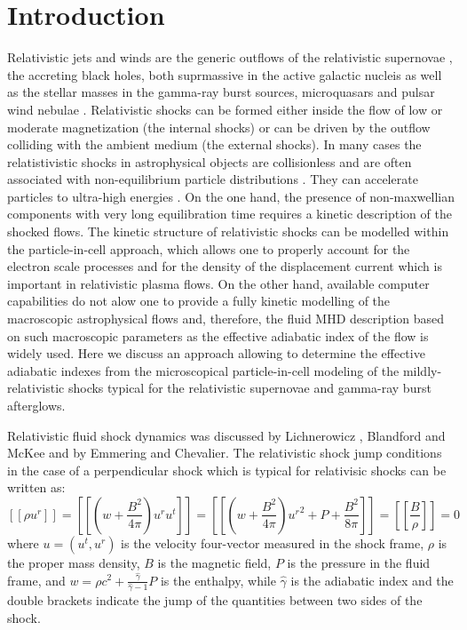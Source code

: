 \documentclass[a4paper]{jpconf}
\begin{document}
	\section{Introduction}
	Relativistic jets and winds are the generic outflows of the relativistic supernovae \cite{2010Natur.463..513S,2007ApJ...667..351W}, the accreting black holes, both suprmassive in the active galactic nucleis  \cite{1984RvMP...56..255B} as well as the stellar masses in the gamma-ray burst sources, microquasars \cite{2019MmSAI..90...57M,1999PhR...314..575P,2014LNP...876.....R} and pulsar wind nebulae \cite{2019MNRAS.488.5690O,2017SSRv..207..235B,2017JPlPh..83e6301K,2019ApJ...876L...8B}. Relativistic shocks can be formed either inside the flow of low or moderate magnetization (the internal shocks) or can be driven by the outflow colliding with the ambient medium (the external shocks). In many cases the relatistivistic shocks in astrophysical objects are collisionless and are often associated with non-equilibrium particle distributions \cite{2012SSRv..173..309B,2015SSRv..191..519S,2017SSRv..207..319P}. They can accelerate particles to ultra-high energies \cite{2009JCAP...11..009L}. On the one hand, the presence of non-maxwellian components with very long equilibration time requires a kinetic description of the shocked flows. The kinetic structure of relativistic shocks can be modelled within the particle-in-cell approach, which allows one to properly account for the electron scale processes and for the density of the displacement current which is important in relativistic plasma flows.  On the other hand, available computer capabilities do not alow one to provide a fully kinetic modelling of the macroscopic astrophysical flows and, therefore, the fluid MHD description based on such macroscopic parameters as the effective adiabatic index of the flow is widely used. Here we discuss an approach allowing to determine the effective adiabatic indexes from the microscopical particle-in-cell modeling of the mildly-relativistic shocks typical for the relativistic supernovae and gamma-ray burst afterglows.   
	
	Relativistic fluid shock dynamics was discussed by Lichnerowicz \cite{1967rhm..book.....L}, Blandford and McKee \cite{Blandford76} and by Emmering and Chevalier\cite{Emmering87}. The relativistic shock jump conditions in the case of a perpendicular shock which is typical for relativisic shocks can be written as:
	\begin{equation}\label{hugoniot}
	[\![\rho u^r]\!] = [\![ (w + \frac{B^2}{4 \pi})u^r u^t]\!] = [\![(w + \frac{B^2}{4 \pi}){u^r}^2 + P + \frac{B^2}{8 \pi}]\!] = [\![\frac{B}{\rho}]\!] = 0
	\end{equation}
	where $u = (u^t,u^r)$ is the velocity four-vector measured in the shock frame, $\rho$ is the proper mass density, $B$ is the magnetic field, $P$ is the pressure in the fluid frame, and $w = \rho c^2 + \frac{\hat{\gamma}}{\hat{\gamma} - 1} P$ is the enthalpy, while $\hat{\gamma}$ is the adiabatic index and the double brackets indicate the jump of the quantities between two sides of the shock.
	
\end{document}
